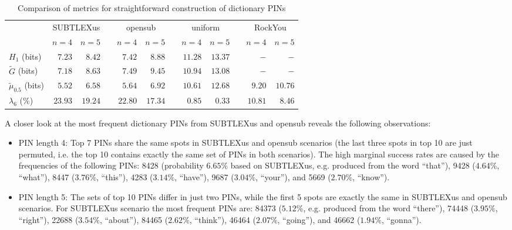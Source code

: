 \documentclass[a4paper, 11pt]{article}
\newcommand{\ra}[1]{\renewcommand{\arraystretch}{#1}}
\begin{document}
\begin{table*}[h]\centering
\ra{1.2}
\begin{tabular}{@{}lrrrrrrrrrrr@{}}\toprule
 & \multicolumn{2}{c}{SUBTLEXus} &\phantom{a} & \multicolumn{2}{c}{opensub} &\phantom{a}& \multicolumn{2}{c}{uniform \cite{SS13}}
   &\phantom{a}& \multicolumn{2}{c}{RockYou \cite{SS13}}\\
   \cmidrule{2-3} \cmidrule{5-6} \cmidrule{8-9} \cmidrule{11-12}
 & $n=4$ & $n=5$ && $n=4$ & $n=5$ && $n=4$ & $n=5$  && $n=4$ & $n=5$ \\ 
\midrule
$H_1$ (bits) 
  & $7.23$ & $8.42$ && $7.42$ & $8.88$ && $11.28$ & $13.37$ && $-$ & $-$ \\
$\tilde G$  (bits) 
  & $7.18$ & $8.63$ && $7.49$ & $9.45$ && $10.94$ & $13.08$ && $-$ & $-$ \\
$\tilde \mu_{0.5}$ (bits) 
  & $5.52$ & $6.58$ && $5.64$ & $6.92$ && $10.61$ & $12.68$ && $9.20$ & $10.76$ \\
$\lambda_{6}$ (\%) 
  & $23.93$ & $19.24$ && $22.80$ & $17.34$ && $0.85$ & $0.33$ && $10.81$ & $8.46$ \\
\bottomrule
\end{tabular}
\caption{Comparison of metrics for straightforward construction of dictionary PINs}\label{tab1-comp}
\end{table*}

A closer look at the most frequent dictionary PINs from SUBTLEXus and opensub reveals the following observations:

\begin{itemize}
\renewcommand{\labelitemi}{$-$}
\item PIN length 4: Top 7 PINs share the same spots in SUBTLEXus and opensub scenarios (the last three spots in 
top 10 are just permuted, i.e. the top 10 contains exactly the same set of PINs in both scenarios). The high marginal 
success rates are caused by the frequencies of the following PINs: 8428 (probability $6.65\%$ based on SUBTLEXus, e.g.
produced from the word ``that''), 9428 ($4.64\%$, ``what''), 8447 ($3.76\%$, ``this''), 4283 ($3.14\%$, ``have''), 
9687 ($3.04\%$, ``your''), and 5669 ($2.70\%$, ``know'').
\item PIN length 5: The sets of top 10 PINs differ in just two PINs, while the first 5 spots are exactly the same
in SUBTLEXus and opensub scenarios. For SUBTLEXus scenario the most frequent PINs are: 84373 ($5.12\%$, e.g. produced 
from the word ``there''), 74448 ($3.95\%$, ``right''), 22688 ($3.54\%$, ``about''), 84465 ($2.62\%$, ``think''),
46464 ($2.07\%$, ``going''), and 46662 ($1.94\%$, ``gonna'').
\end{itemize}
\end{document}
